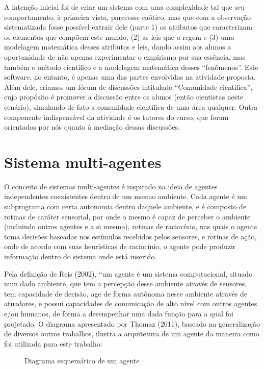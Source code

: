 \documentclass{article}
\begin{document}
A intenção inicial foi de criar um sistema com uma complexidade tal que seu
comportamento, à primeira vista, parecesse caótico, mas que com a observação
sistematizada fosse possível extrair dele (parte 1) os atributos que caracterizam os
elementos que compõem este mundo, (2) as leis que o regem e (3) uma modelagem
matemática desses atributos e leis, dando assim aos alunos a oportunidade de não
apenas experimentar o empirismo por sua essência, mas também o método científico e a
modelagem matemática desses “fenômenos”. Este software, no entanto, é apenas uma
das partes envolvidas na atividade proposta. Além dele, criamos um fórum de
discussões intitulado “Comunidade científica”, cujo propósito é promover a discussão
entre os alunos (então cientistas neste cenário), simulando de fato a comunidade
científica de uma área qualquer. Outra componente indispensável da atividade é os
tutores do curso, que foram orientados por nós quanto à mediação dessas discussões.

\section{Sistema multi-agentes}

O conceito de sistemas multi-agentes é inspirado na ideia de agentes independentes
coexistentes dentro de um mesmo ambiente. Cada agente é um subprograma com
certa autonomia dentro daquele ambiente, e é composto de rotinas de caráter sensorial,
por onde o mesmo é capaz de perceber o ambiente (incluindo outros agentes e a si
mesmo), rotinas de raciocínio, nas quais o agente toma decisões baseadas nos estímulos
recebidos pelos sensores, e rotinas de ação, onde de acordo com suas heurísticas de
raciocínio, o agente pode produzir informação dentro do sistema onde está inserido.

Pela definição de Reis (2002), “um agente é um sistema computacional, situado
num dado ambiente, que tem a percepção desse ambiente através de sensores, tem
capacidade de decisão, age de forma autônoma nesse ambiente através de atuadores, e
possui capacidades de comunicação de alto nível com outros agentes e/ou humanos, de
forma a desempenhar uma dada função para a qual foi projetado. O diagrama
apresentado por Thomaz (2011), baseado na generalização de diversos outros trabalhos,
ilustra a arquitetura de um agente da maneira como foi utilizada para este trabalho:

\begin{figure}
	\centering
	\caption{Diagrama esquemático de um agente}
	\label{fig:mas-scheme}
\end{figure}
\end{document}
